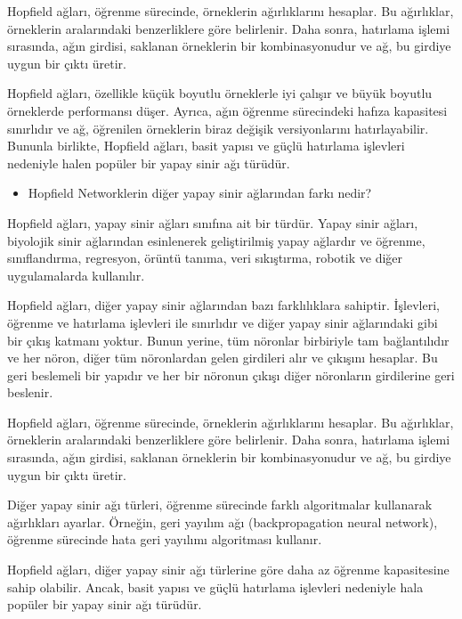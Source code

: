 \documentclass[11pt]{article}
\begin{document}
Hopfield ağları, öğrenme sürecinde, örneklerin ağırlıklarını hesaplar. Bu ağırlıklar, örneklerin aralarındaki benzerliklere göre belirlenir. Daha sonra, hatırlama işlemi sırasında, ağın girdisi, saklanan örneklerin bir kombinasyonudur ve ağ, bu girdiye uygun bir çıktı üretir.

Hopfield ağları, özellikle küçük boyutlu örneklerle iyi çalışır ve büyük boyutlu örneklerde performansı düşer. Ayrıca, ağın öğrenme sürecindeki hafıza kapasitesi sınırlıdır ve ağ, öğrenilen örneklerin biraz değişik versiyonlarını hatırlayabilir. Bununla birlikte, Hopfield ağları, basit yapısı ve güçlü hatırlama işlevleri nedeniyle halen popüler bir yapay sinir ağı türüdür.


\begin{itemize}
    \item Hopfield Networklerin diğer yapay sinir ağlarından farkı nedir?\\
\end{itemize}
Hopfield ağları, yapay sinir ağları sınıfına ait bir türdür. Yapay sinir ağları, biyolojik sinir ağlarından esinlenerek geliştirilmiş yapay ağlardır ve öğrenme, sınıflandırma, regresyon, örüntü tanıma, veri sıkıştırma, robotik ve diğer uygulamalarda kullanılır.

Hopfield ağları, diğer yapay sinir ağlarından bazı farklılıklara sahiptir. İşlevleri, öğrenme ve hatırlama işlevleri ile sınırlıdır ve diğer yapay sinir ağlarındaki gibi bir çıkış katmanı yoktur. Bunun yerine, tüm nöronlar birbiriyle tam bağlantılıdır ve her nöron, diğer tüm nöronlardan gelen girdileri alır ve çıkışını hesaplar. Bu geri beslemeli bir yapıdır ve her bir nöronun çıkışı diğer nöronların girdilerine geri beslenir.

Hopfield ağları, öğrenme sürecinde, örneklerin ağırlıklarını hesaplar. Bu ağırlıklar, örneklerin aralarındaki benzerliklere göre belirlenir. Daha sonra, hatırlama işlemi sırasında, ağın girdisi, saklanan örneklerin bir kombinasyonudur ve ağ, bu girdiye uygun bir çıktı üretir.

Diğer yapay sinir ağı türleri, öğrenme sürecinde farklı algoritmalar kullanarak ağırlıkları ayarlar. Örneğin, geri yayılım ağı (backpropagation neural network), öğrenme sürecinde hata geri yayılımı algoritması kullanır.

Hopfield ağları, diğer yapay sinir ağı türlerine göre daha az öğrenme kapasitesine sahip olabilir. Ancak, basit yapısı ve güçlü hatırlama işlevleri nedeniyle hala popüler bir yapay sinir ağı türüdür.
\end{document}
